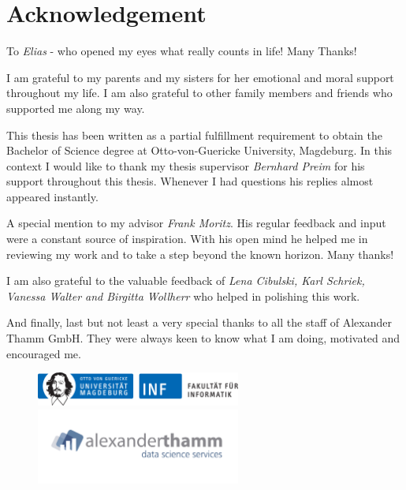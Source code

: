 \chapter{Acknowledgement}
\setlength{\parindent}{0cm}
To \textit{Elias} - who opened my eyes what really counts in life! Many Thanks!
\par
I am grateful to my parents and my sisters for her emotional and moral support throughout my life. I am also grateful to other family members and friends who supported me along my way.
\par
This thesis has been written as a partial fulfillment requirement to obtain the Bachelor of Science degree at Otto-von-Guericke University, Magdeburg. 
In this context I would like to thank my thesis supervisor \textit{Bernhard Preim} for his support throughout this thesis. Whenever I had questions his replies almost appeared instantly.  
\par
A special mention to my advisor \textit{Frank Moritz}. His regular feedback and input were a constant source of inspiration. With his open mind he helped me in reviewing my work and to take a step beyond the known horizon. Many thanks!
 \par
I am also grateful to the valuable feedback of \textit{Lena Cibulski, Karl Schriek, Vanessa Walter and Birgitta Wollherr} who helped in polishing this work.  
\par
And finally, last but not least a very special thanks to all the staff of Alexander Thamm GmbH. They were always keen to know what I am doing, motivated and encouraged me.     

\begin{figure}[b]
    \includegraphics[width=0.6\textwidth]{src/images/logo}\\
    \includegraphics[width=0.6\textwidth]{src/images/logo-alexanderthamm-gmbh-3}
    \label{fig:my_label}
\end{figure}

\markboth{}{}